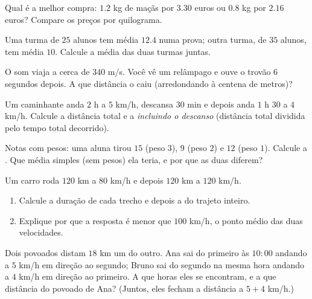 \begin{exercise}[$\star$]\label{exo:g8:speed:5}
Qual é a melhor compra: $1.2$ kg de maçãs por $3.30$ euros ou $0.8$ kg
por $2.16$ euros? Compare os preços por quilograma.
\end{exercise}

\begin{exercise}[$\star$]\label{exo:g8:speed:6}
Uma turma de $25$ alunos tem média $12.4$ numa prova; outra turma, de
$35$ alunos, tem média $10$. Calcule a média das duas turmas juntas.
\end{exercise}

\begin{exercise}[$\star$]\label{exo:g8:speed:7}
O som viaja a cerca de $340$ m/s. Você vê um relâmpago e ouve o trovão
$6$ segundos depois. A que distância o  caiu (arredondando à
centena de metros)?
\end{exercise}

\begin{exercise}[$\star\star$]\label{exo:g8:speed:8}
Um caminhante anda $2$ h a $5$ km/h, descansa $30$ min e depois anda
$1$ h $30$ a $4$ km/h. Calcule a distância total e a 
\emph{incluindo o descanso} (distância total dividida pelo tempo total
decorrido).
\end{exercise}

\begin{exercise}[$\star\star$]\label{exo:g8:speed:9}
Notas com pesos: uma aluna tirou $15$ (peso $3$), $9$ (peso $2$) e
$12$ (peso $1$). Calcule a . Que média simples (sem
pesos) ela teria, e por que as duas diferem?
\end{exercise}

\begin{exercise}[$\star\star$]\label{exo:g8:speed:10}
Um carro roda $120$ km a $80$ km/h e depois $120$ km a $120$ km/h.
\begin{enumerate}
  \item Calcule a duração de cada trecho e depois a 
        do trajeto inteiro.
  \item Explique por que a resposta é menor que $100$ km/h, o ponto
        médio das duas velocidades.
\end{enumerate}
\end{exercise}

\begin{exercise}[$\star\star\star$]\label{exo:g8:speed:11}
Dois povoados distam $18$ km um do outro. Ana sai do primeiro às
$10{:}00$ andando a $5$ km/h em direção ao segundo; Bruno sai do
segundo na mesma hora andando a $4$ km/h em direção ao primeiro. A que
horas eles se encontram, e a que distância do povoado de Ana? (Juntos,
eles fecham a distância a $5 + 4$ km/h.)
\end{exercise}

